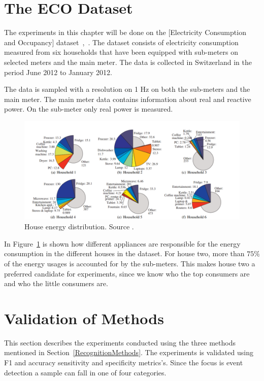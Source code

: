 \section{The ECO Dataset}
The experiments in this chapter will be done on the [Electricity Consumption and Occupancy] dataset~\citep{RefWorks:26},~\citep{RefWorks:27}. The dataset consists of electricity consumption measured from six households that have been equipped with sub-meters on selected meters and the main meter. The data is collected in Switzerland in the period June 2012 to January 2012. 

The data is sampled with a resolution on 1 Hz on both the sub-meters and the main meter. The main meter data contains information about real and reactive power. On the sub-meter only real power is measured. 

\begin{figure}[H]
\centering
\includegraphics[width=1\textwidth]{billeder/ECOHouses.png}
\caption[House energy distribution.]{House energy distribution. Source \citep{RefWorks:26}.}
\label{fig:EHD}
\end{figure}

In Figure~\ref{fig:EHD} is shown how different appliances are responsible for the energy consumption in the different houses in the  dataset. For house two, more than $75\%$ of the energy usages is accounted for by the sub-meters. This makes house two a preferred candidate for experiments, since we know who the top consumers are and who the little consumers are.  

\section{Validation of Methods} 
\label{sec:VOM}
This section describes the experiments conducted using the three methods mentioned in Section~\ref{RecognitionMethods}. The experiments is validated using F1 and accuracy sensitivity and specificity metrics's. Since the focus is event detection a sample can fall in one of four categories. 

